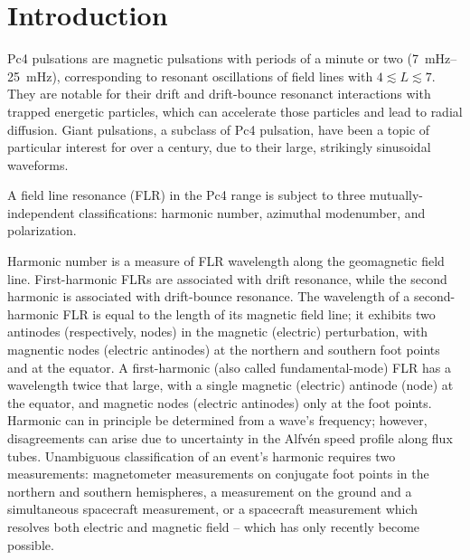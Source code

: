 \documentclass{article}
\newcommand{\Alfven}{Alfv\'en\xspace}
\begin{document}


\section{Introduction}

Pc4 pulsations are magnetic pulsations with periods of a minute or two (\SIrange{7}{25}{\mHz}), corresponding to resonant oscillations of field lines with $4 \lesssim L \lesssim 7$. They are notable for their drift and drift-bounce resonanct interactions with trapped energetic particles\cite{southwood_1976}, which can accelerate those particles\cite{elkington_1999} and lead to radial diffusion\cite{elkington_2003}. Giant pulsations, a subclass of Pc4 pulsation, have been a topic of particular interest for over a century, due to their large, strikingly sinusoidal waveforms\cite{brekke_1987}.

A field line resonance (FLR) in the Pc4 range is subject to three mutually-independent classifications: harmonic number, azimuthal modenumber, and polarization.

Harmonic number is a measure of FLR wavelength along the geomagnetic field line. First-harmonic FLRs are associated with drift resonance, while the second harmonic is associated with drift-bounce resonance\cite{dai_2013,poulter_1983}. The wavelength of a second-harmonic FLR is equal to the length of its magnetic field line; it exhibits two antinodes (respectively, nodes) in the magnetic (electric) perturbation, with magnentic nodes (electric antinodes) at the northern and southern foot points and at the equator. A first-harmonic (also called fundamental-mode) FLR has a wavelength twice that large, with a single magnetic (electric) antinode (node) at the equator, and magnetic nodes (electric antinodes) only at the foot points. Harmonic can in principle be determined from a wave's frequency; however, disagreements can arise due to uncertainty in the \Alfven speed profile along flux tubes\cite{takahashi_2013}. Unambiguous classification of an event's harmonic requires two measurements: magnetometer measurements on conjugate foot points in the northern and southern hemispheres, a measurement on the ground and a simultaneous spacecraft measurement, or a spacecraft measurement which resolves both electric and magnetic field\cite{dai_2015} -- which has only recently become possible\cite{angelopoulos_2008,stratton_2012}.
\end{document}
